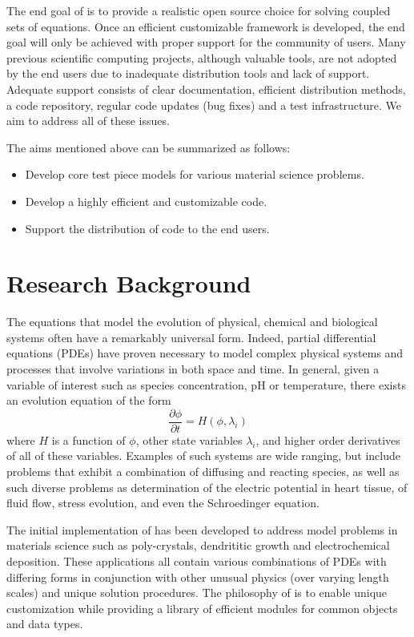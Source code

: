 The end goal of \FiPy{} is to provide a realistic open source choice
for solving coupled sets of equations. Once an efficient customizable
framework is developed, the end goal will only be achieved with proper
support for the community of users. Many previous scientific computing
projects, although valuable tools, are not adopted by the end users
due to inadequate distribution tools and lack of support. Adequate
support consists of clear documentation, efficient distribution
methods, a code repository, regular code updates (bug fixes) and a
test infrastructure. We aim to address all of these issues.

The aims mentioned above can be summarized as
follows:
\begin{itemize}
\item Develop core test piece models for various material science problems.
\item Develop a highly efficient and customizable code.
\item Support the distribution of code to the end users.
\end{itemize}

\section{Research Background}

The equations that model the evolution of physical, chemical and
biological systems often have a remarkably universal form. Indeed,
partial differential equations (PDEs) have proven necessary to model
complex physical systems and processes that involve variations in both
space and time.  In general, given a variable of interest such as
species concentration, pH or temperature, there exists an evolution
equation of the form
\begin{equation}
  \frac{\partial \phi}{\partial t} = H(\phi, \lambda_i)
  \label{eqn:general-equation}
\end{equation}
where $H$ is a function of $\phi$, other state variables $\lambda_i$,
and higher order derivatives of all of these variables. Examples of
such systems are wide ranging, but include problems that exhibit a
combination of diffusing and reacting species, as well as such diverse
problems as determination of the electric potential in heart tissue,
of fluid flow, stress evolution, and even the Schroedinger equation.

The initial implementation of \FiPy{} has been developed to address
model problems in materials science such as poly-crystals, dendrititic
growth and electrochemical deposition. These applications all contain
various combinations of PDEs with differing forms in conjunction with
other unusual physics (over varying length scales) and unique solution
procedures. The philosophy of \FiPy{} is to enable unique
customization while providing a library of efficient modules for
common objects and data types.

